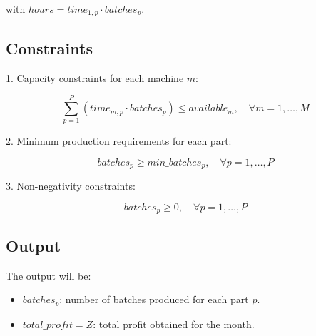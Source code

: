 \documentclass{article}
\begin{document}
with \( hours = time_{1,p} \cdot batches_p \).

\subsection*{Constraints}
1. Capacity constraints for each machine \( m \):

\[
\sum_{p=1}^{P} (time_{m,p} \cdot batches_p) \leq available_m, \quad \forall m = 1, \ldots, M
\]

2. Minimum production requirements for each part:

\[
batches_p \geq min\_batches_p, \quad \forall p = 1, \ldots, P
\]

3. Non-negativity constraints:

\[
batches_p \geq 0, \quad \forall p = 1, \ldots, P
\]

\subsection*{Output}
The output will be:

\begin{itemize}
    \item \( batches_p \): number of batches produced for each part \( p \).
    \item \( total\_profit = Z \): total profit obtained for the month.
\end{itemize}
\end{document}

